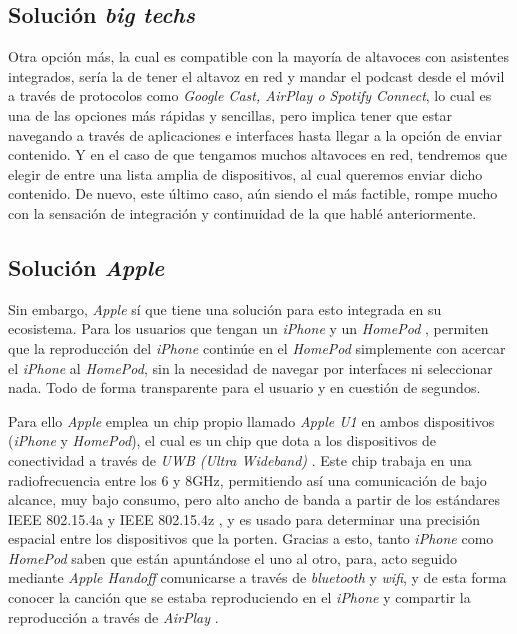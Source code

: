 \subsection{Solución \emph{big techs}}
Otra opción más, la cual es compatible con la mayoría de altavoces con
asistentes integrados, sería la de tener el altavoz en red y mandar el podcast
desde el móvil a través de protocolos como \emph{Google Cast, AirPlay o Spotify
Connect}, lo cual es una de las opciones más rápidas y sencillas, pero implica
tener que estar navegando a través de aplicaciones e interfaces hasta llegar a
la opción de enviar contenido. Y en el caso de que tengamos muchos altavoces en
red, tendremos que elegir de entre una lista amplia de dispositivos, al cual
queremos enviar dicho contenido. De nuevo, este último caso, aún siendo el más
factible, rompe mucho con la sensación de integración y continuidad de la que
hablé anteriormente. 

\subsection{Solución \emph{Apple}} Sin embargo, \emph{Apple} sí que tiene una
solución para esto integrada en su ecosistema. Para los usuarios que tengan un
\emph{iPhone} y un \emph{HomePod} \cite{HomePod}, permiten que la reproducción
del \emph{iPhone} continúe en el \emph{HomePod} simplemente con acercar el
\emph{iPhone} al \emph{HomePod}, sin la necesidad de navegar por interfaces ni
seleccionar nada. Todo de forma transparente para el usuario y en cuestión de
segundos. 

Para ello \emph{Apple} emplea un chip propio llamado \emph{Apple U1} \cite{U1}
en ambos dispositivos (\emph{iPhone} y \emph{HomePod}), el cual es un chip que
dota a los dispositivos de conectividad a través de \emph{UWB (Ultra Wideband)}
\cite{UWB}. Este chip trabaja en una radiofrecuencia entre los 6 y 8GHz,
permitiendo así una comunicación de bajo alcance, muy bajo consumo, pero alto
ancho de banda a partir de los estándares IEEE 802.15.4a y IEEE 802.15.4z
\cite{IEEE_802-15-4}, y es usado para determinar una precisión espacial entre
los dispositivos que la porten. Gracias a esto, tanto \emph{iPhone} como
\emph{HomePod} saben que están apuntándose el uno al otro, para, acto seguido
mediante \emph{Apple Handoff} \cite{Handoff} comunicarse a través de
\emph{bluetooth} y \emph{wifi}, y de esta forma conocer la canción que se estaba
reproduciendo en el \emph{iPhone} y compartir la reproducción a través de
\emph{AirPlay} \cite{AirPlay}.

